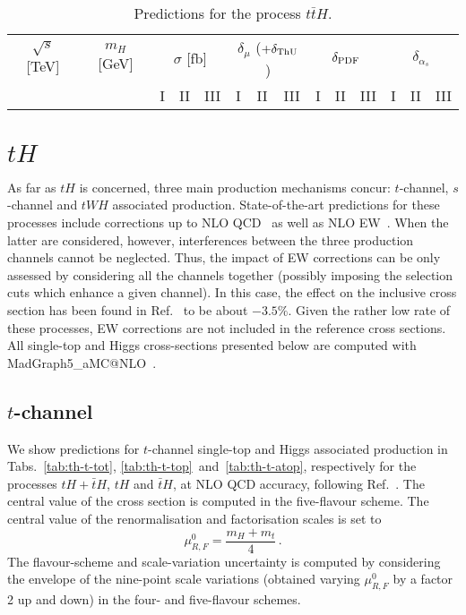 \documentclass[a4paper,usenames,dvipsnames,11pt]{article}
\begin{document}
\begin{table}
    \centering
    \begin{tabular}{cccccccccccccc}
        $\sqrt{s}$ [TeV]  &  $m_H$ [GeV]  & \multicolumn{3}{c}{$\sigma$ [fb]}  & \multicolumn{3}{c}{$\delta_{\mu}$ ($+\delta_{\rm ThU}$)}   &  \multicolumn{3}{c}{$\delta_{\rm PDF}$}   
        & \multicolumn{3}{c}{$\delta_{\alpha_s}$}\\
         & & I & II & III & I & II & III & I & II & III & I & II & III\\
        \hline
          
    \end{tabular}
    \caption{\label{tab:tth} Predictions for the process $t \bar t H$.}
\end{table}
\clearpage


\section{$tH$}
As far as $tH$ is concerned, three main production mechanisms concur: $t$-channel, $s$-channel and $tWH$ associated production. State-of-the-art predictions
for these processes include corrections up to NLO QCD~\cite{Demartin:2015uha,Demartin:2016axk} as well as NLO EW~\cite{Pagani:2020mov}. When
the latter are considered, however, interferences between the three production channels cannot be neglected. Thus, the impact of EW corrections can be only assessed
by considering all the channels together (possibly imposing the selection cuts which enhance a given channel). In this case, the effect on the inclusive
cross section has been found in Ref.~\cite{Pagani:2020mov} to be about $-3.5\%$. Given the rather low rate of these processes, EW
corrections are not included in the reference cross sections.\\

All single-top and Higgs cross-sections presented below are computed with {\sc MadGraph5\_aMC@NLO}~\cite{Alwall:2014hca,Frederix:2018nkq}. 

\subsection{$t$-channel}
We show predictions for $t$-channel single-top and Higgs associated production in Tabs.~\ref{tab:th-t-tot}, \ref{tab:th-t-top}~and~\ref{tab:th-t-atop},
respectively for the processes $tH + \bar t H$, $tH$ and $\bar t H$, at NLO QCD accuracy, following Ref.~\cite{Demartin:2015uha}. The 
central value of the cross section is computed in the five-flavour scheme. 
The central value of the renormalisation and factorisation scales is set to
\begin{equation}
    \mu_{R,F}^0 = \frac{m_H+m_t}{4}\,.
\end{equation}
The flavour-scheme and scale-variation uncertainty is computed by considering the envelope of the 
nine-point scale variations (obtained varying $ \mu_{R,F}^0$ by a factor 2 up and down) in the four- and five-flavour schemes.
\end{document}
